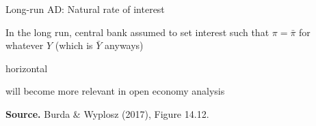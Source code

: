 \documentclass{beamer}
\newcommand{\tb}[1]{{\color{blue}{\textbf{#1}}}}
\newenvironment{mytemize}
{\vfill\itemize[nolistsep,itemsep=\fill,label=\color{blue}{$\triangleright$}]}
  {\enditemize}
\begin{document}
\begin{frame}{Long-run AD: Natural rate of interest}
  \begin{mytemize}
	\item In the long run, central bank assumed to set interest such that $\pi = \bar \pi$ for whatever $Y$ (which is $\bar Y$ anyways) 
	\begin{mytemize}
	\item horizontal \tb{LAD}
	\item will become more relevant in open economy analysis
	\end{mytemize}
  \end{mytemize}
\begin{center}
\begin{figure}[h!]
\end{figure}
\begin{minipage}{0.5\columnwidth}
\tiny	
\textbf{Source.} Burda \& Wyplosz (2017), Figure 14.12.\\
\end{minipage}
\end{center}
\end{frame}
\end{document}
